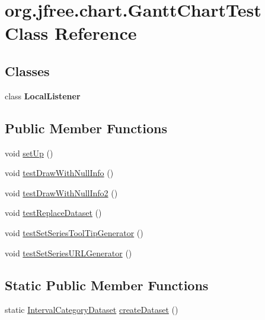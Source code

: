 \hypertarget{classorg_1_1jfree_1_1chart_1_1_gantt_chart_test}{}\section{org.\+jfree.\+chart.\+Gantt\+Chart\+Test Class Reference}
\label{classorg_1_1jfree_1_1chart_1_1_gantt_chart_test}
\subsection*{Classes}
\begin{DoxyCompactItemize}
\item 
class {\bfseries Local\+Listener}
\end{DoxyCompactItemize}
\subsection*{Public Member Functions}
\begin{DoxyCompactItemize}
\item 
void \mbox{\hyperlink{classorg_1_1jfree_1_1chart_1_1_gantt_chart_test_a01394a12caf440a7b41415f5552538d6}{set\+Up}} ()
\item 
void \mbox{\hyperlink{classorg_1_1jfree_1_1chart_1_1_gantt_chart_test_adf386c68ea3533fd68f1976e6f069982}{test\+Draw\+With\+Null\+Info}} ()
\item 
void \mbox{\hyperlink{classorg_1_1jfree_1_1chart_1_1_gantt_chart_test_a35fd216a54f15e95895cef2044baad12}{test\+Draw\+With\+Null\+Info2}} ()
\item 
void \mbox{\hyperlink{classorg_1_1jfree_1_1chart_1_1_gantt_chart_test_abd184f83ee444a16059ef0d7d7ab0465}{test\+Replace\+Dataset}} ()
\item 
void \mbox{\hyperlink{classorg_1_1jfree_1_1chart_1_1_gantt_chart_test_a4725ecb1ed80c9b648246d41214720ce}{test\+Set\+Series\+Tool\+Tip\+Generator}} ()
\item 
void \mbox{\hyperlink{classorg_1_1jfree_1_1chart_1_1_gantt_chart_test_a1fe0a749c1d0451d473e91cff5224d78}{test\+Set\+Series\+U\+R\+L\+Generator}} ()
\end{DoxyCompactItemize}
\subsection*{Static Public Member Functions}
\begin{DoxyCompactItemize}
\item 
static \mbox{\hyperlink{interfaceorg_1_1jfree_1_1data_1_1category_1_1_interval_category_dataset}{Interval\+Category\+Dataset}} \mbox{\hyperlink{classorg_1_1jfree_1_1chart_1_1_gantt_chart_test_aa82a6d0e545ee976d47355c0b4ff9355}{create\+Dataset}} ()
\end{DoxyCompactItemize}


